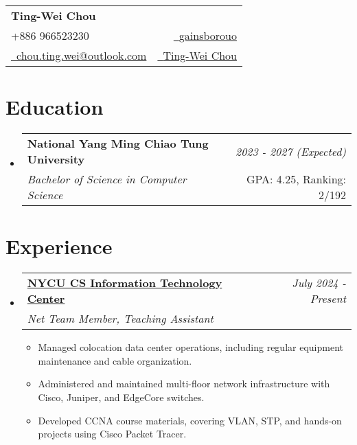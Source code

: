 \documentclass[a4paper,11pt]{article}
\makeatletter
\newcommand{\resumeSubheading}[4]{
\vspace{0.5mm}\item
    \begin{tabular*}{0.98\textwidth}[t]{l@{\extracolsep{\fill}}r}
        \textbf{#1} & \textit{\footnotesize{#4}} \\
        \textit{\footnotesize{#3}} &  \footnotesize{#2}\\
    \end{tabular*}
    \vspace{-2.4mm}
}
\newcommand{\resumeSubHeadingListStart}{\begin{itemize}[leftmargin=*,labelsep=0mm]}
\newcommand{\resumeItemListStart}{\begin{justify}\begin{itemize}[leftmargin=3ex, rightmargin=2ex, noitemsep,labelsep=1.2mm,itemsep=0mm]\small}
\newcommand{\resumeSubHeadingListEnd}{\end{itemize}\vspace{2mm}}
\newcommand{\resumeItemListEnd}{\end{itemize}\end{justify}\vspace{-2mm}}
\newcommand{\name}{Ting-Wei Chou} %
\newcommand{\phone}{966523230}
\newcommand{\emaila}{chou.ting.wei@outlook.com}
\makeatother
\begin{document}
\selectfont


\parbox{\dimexpr\linewidth-0.3cm\relax}{
\begin{tabularx}{\linewidth}{L r} \\
  \textbf{\Large \name} \\ 
  {\raisebox{0em}{\footnotesize \faPhone} +886 \phone} & \href{https://github.com/gainsborouo}{\raisebox{0.0\height}{\footnotesize \faGithub}\ {gainsborouo}}\\
  \href{mailto:\emaila}{\raisebox{0.0\height}{\footnotesize 
 \faEnvelope}\ {\emaila}}&\href{https://www.linkedin.com/in/userwei}{\raisebox{0.0\height}{\footnotesize \faLinkedin}\ {Ting-Wei Chou}}
\end{tabularx}
}

\section{\textbf{Education}}
  \resumeSubHeadingListStart
    \resumeSubheading
      {National Yang Ming Chiao Tung University}{GPA: 4.25, Ranking: 2/192}
      {Bachelor of Science in Computer Science}{2023 - 2027 (Expected)}
  \resumeSubHeadingListEnd
\vspace{-5.5mm}
%



\section{\textbf{Experience}}
  \resumeSubHeadingListStart
    \resumeSubheading
      {\href{https://www.linkedin.com/company/nycu-csit/}{NYCU CS Information Technology Center}}{}
      {Net Team Member, Teaching Assistant}{July 2024 - Present}
      \vspace{-2.0mm}
      \resumeItemListStart
        \item {Managed colocation data center operations, including regular equipment maintenance and cable organization.}
        \item {Administered and maintained multi-floor network infrastructure with Cisco, Juniper, and EdgeCore switches.}
        \item {Developed CCNA course materials, covering VLAN, STP, and hands-on projects using Cisco Packet Tracer.}
      \resumeItemListEnd
  \resumeSubHeadingListEnd
\vspace{-8.5mm}
\end{document}
